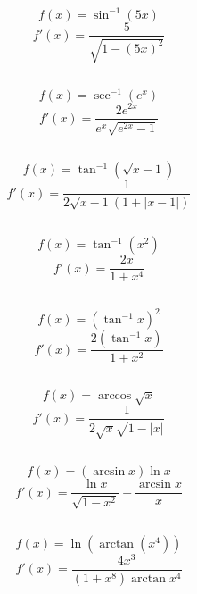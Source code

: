 \documentclass[11pt,oneside,titlepage]{book}
\begin{document}
$$f(x) = \sin^{-1}(5x)$$
$$f'(x) = \frac{5}{\sqrt{1 - (5x)^2}}$$

\subsection{}

$$f(x) = \sec^{-1}(e^x)$$
$$f'(x) = \frac{2 e^{2x}}{e^x \sqrt{e^{2x} - 1}}$$

\subsection{}

$$ f(x) = \tan^{-1}(\sqrt{x - 1})$$
$$ f'(x) = \frac{1}{2 \sqrt{x - 1}(1 + |x - 1|)}$$

\subsection{}

$$f(x) = \tan^{-1}(x^2) $$
$$f'(x) = \frac{2x}{1 + x^4}$$

\subsection{}

$$f(x) = (\tan^{-1}x)^2$$
$$f'(x) = \frac{2(\tan^{-1}x)}{1 + x^2}$$

\subsection{}

$$f(x) = \arccos\sqrt{x}$$
$$f'(x) = \frac{1}{2 \sqrt{x} \sqrt{1 - |x|}}$$

\subsection{}

$$f(x) = (\arcsin x) \ln x$$
$$f'(x) = \frac{\ln x}{\sqrt{1 - x^2}} + \frac{\arcsin x}{x}$$


\subsection{}

$$ f(x) = \ln(\arctan(x^4))$$
$$ f'(x) = \frac{4 x^3}{(1 + x^8)\arctan x^4}$$

\subsection{}
\end{document}
